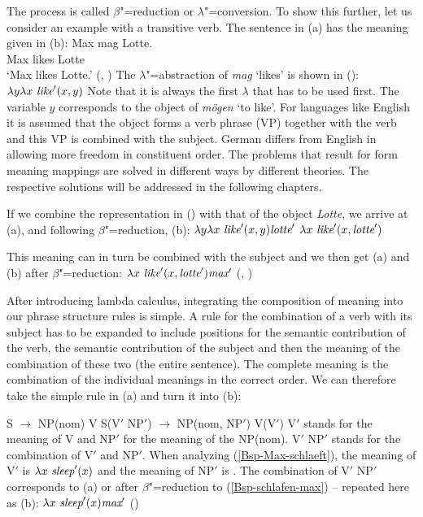 \z
The process is called $\beta$"=reduction or 
$\lambda$"=conversion. To show this further, let us consider an example with a transitive verb. The sentence
in (a) has the meaning given in (b):
\eal
\ex\label{Bsp-Max-mag-Lotte} 
\gll Max mag Lotte.\\
     Max likes Lotte\\
\glt `Max likes Lotte.'
\ex {}(, )
\zl
The $\lambda$"=abstraction of \emph{mag} `likes' is shown in ():
\ea
$\lambda y \lambda x~\textit{like}'(x, y)$
\z
Note that it is always the first $\lambda$ that has to be used first. The variable $y$ corresponds
to the object of \emph{mögen} `to like'. For languages like English it is assumed that the object forms a verb
phrase (VP) together with the verb and this VP is combined with the subject. German differs from
English in allowing more freedom in constituent order. The problems that result for form meaning
mappings are solved in different ways by different theories. The respective solutions will be
addressed in the following chapters.


If we combine the representation in () with that of the object \emph{Lotte}, we arrive at (a), and following
$\beta$"=reduction, (b):
\eal
\label{lambda-moegen}
\ex $\lambda y \lambda x~\textit{like}'(x, y) \textit{lotte}'$
\ex $\lambda x~\textit{like}'(x, \textit{lotte}')$
\zl

\noindent
This meaning can in turn be combined with the subject and we then get (a) and (b) after $\beta$"=reduction:
\eal
\ex $\lambda x~\textit{like}'(x, \textit{lotte}') \textit{max}'$
\ex {}(, )
\zl

\begin{sloppypar}
\noindent
After introducing lambda calculus, integrating the composition of meaning into our phrase structure rules is simple. A rule for the
combination of a verb with its subject has to be expanded to include positions for the semantic contribution of the verb, the semantic
contribution of the subject and then the meaning of the combination of these two (the entire sentence). The complete meaning is the
combination of the individual meanings in the correct order. We can therefore take the simple rule in (a) and turn it into 
(b):
\end{sloppypar}
\eal
\ex S $\to$ NP(nom) V
\ex S(V$'$ NP$'$) $\to$ NP(nom, NP$'$) V(V$'$)
\zl
V$'$ stands for the meaning of V and NP$'$ for the meaning of the NP(nom). V$'$ NP$'$ stands for the combination of V$'$ and NP$'$. When analyzing
(\ref{Bsp-Max-schlaeft}), the meaning of V$'$ is $\lambda x~\textit{sleep}'(x)$ and the meaning of NP$'$ is . The combination of V$'$ NP$'$
corresponds to (a) or after $\beta$"=reduction to (\ref{Bsp-schlafen-max}) -- repeated here as (b):
\eal
\ex $\lambda x~\textit{sleep}'(x) \textit{max}'$
\ex {}()
\zl

